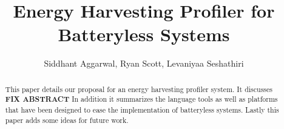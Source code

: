 \documentclass[10pt, sigconf ]{acmart}
\title{Energy Harvesting Profiler for Batteryless Systems}
\author{Siddhant Aggarwal, Ryan Scott, Levaniyaa Seshathiri}
\begin{document}
\begin{abstract}
 This paper details our proposal for an energy harvesting profiler system.
 It discusses \textbf{FIX ABSTRACT}
 In addition it summarizes the language tools as well as platforms that have been designed to ease the implementation of batteryless systems.
 Lastly this paper adds some ideas for future work.
\end{abstract}

\maketitle




%




\end{document}
